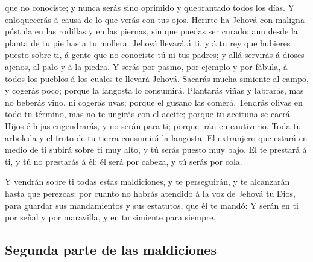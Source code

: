 que no conociste; y nunca serás sino oprimido y quebrantado todos los
días.  Y enloquecerás á causa de lo que verás con tus
ojos.  Herirte ha Jehová con maligna pústula en las
rodillas y en las piernas, sin que puedas ser curado: aun desde la
planta de tu pie hasta tu mollera.  Jehová llevará á ti,
y á tu rey que hubieres puesto sobre ti, á gente que no conociste tú ni
tus padres; y allá servirás á dioses ajenos, al palo y á la piedra.
 Y serás por pasmo, por ejemplo y por fábula, á todos los
pueblos á los cuales te llevará Jehová.  Sacarás mucha
simiente al campo, y cogerás poco; porque la langosta lo consumirá.
 Plantarás viñas y labrarás, mas no beberás vino, ni
cogerás uvas; porque el gusano las comerá.  Tendrás
olivas en todo tu término, mas no te ungirás con el aceite; porque tu
aceituna se caerá.  Hijos é hijas engendrarás, y no serán
para ti; porque irán en cautiverio.  Toda tu arboleda y
el fruto de tu tierra consumirá la langosta.  El
extranjero que estará en medio de ti subirá sobre ti muy alto, y tú
serás puesto muy bajo.  El te prestará á ti, y tú no
prestarás á él: él será por cabeza, y tú serás por cola.

 Y vendrán sobre ti todas estas maldiciones, y te
perseguirán, y te alcanzarán hasta que perezcas; por cuanto no habrás
atendido á la voz de Jehová tu Dios, para guardar sus mandamientos y sus
estatutos, que él te mandó:  Y serán en ti por señal y
por maravilla, y en tu simiente para siempre.

\hypertarget{segunda-parte-de-las-maldiciones}{%
\subsection{Segunda parte de las
maldiciones}\label{segunda-parte-de-las-maldiciones}}

